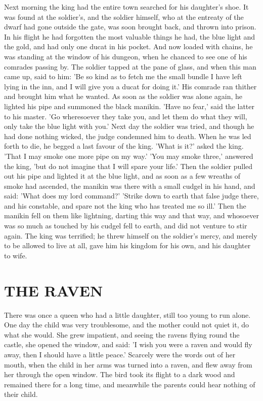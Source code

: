 \documentclass[12pt]{book}
\begin{document}
Next morning the king had the entire town searched for his daughter's
shoe. It was found at the soldier's, and the soldier himself, who at
the entreaty of the dwarf had gone outside the gate, was soon brought
back, and thrown into prison. In his flight he had forgotten the most
valuable things he had, the blue light and the gold, and had only one
ducat in his pocket. And now loaded with chains, he was standing at
the window of his dungeon, when he chanced to see one of his comrades
passing by. The soldier tapped at the pane of glass, and when this man
came up, said to him: 'Be so kind as to fetch me the small bundle I
have left lying in the inn, and I will give you a ducat for doing it.'
His comrade ran thither and brought him what he wanted. As soon as the
soldier was alone again, he lighted his pipe and summoned the black
manikin. 'Have no fear,' said the latter to his master. 'Go
wheresoever they take you, and let them do what they will, only take
the blue light with you.' Next day the soldier was tried, and though
he had done nothing wicked, the judge condemned him to death. When he
was led forth to die, he begged a last favour of the king. 'What is
it?' asked the king. 'That I may smoke one more pipe on my way.' 'You
may smoke three,' answered the king, 'but do not imagine that I will
spare your life.' Then the soldier pulled out his pipe and lighted it
at the blue light, and as soon as a few wreaths of smoke had ascended,
the manikin was there with a small cudgel in his hand, and said: 'What
does my lord command?' 'Strike down to earth that false judge there,
and his constable, and spare not the king who has treated me so ill.'
Then the manikin fell on them like lightning, darting this way and
that way, and whosoever was so much as touched by his cudgel fell to
earth, and did not venture to stir again. The king was terrified; he
threw himself on the soldier's mercy, and merely to be allowed to live
at all, gave him his kingdom for his own, and his daughter to wife.



\chapter{THE RAVEN}

There was once a queen who had a little daughter, still too young to
run alone. One day the child was very troublesome, and the mother
could not quiet it, do what she would. She grew impatient, and seeing
the ravens flying round the castle, she opened the window, and said:
'I wish you were a raven and would fly away, then I should have a
little peace.' Scarcely were the words out of her mouth, when the
child in her arms was turned into a raven, and flew away from her
through the open window. The bird took its flight to a dark wood and
remained there for a long time, and meanwhile the parents could hear
nothing of their child.
\end{document}

